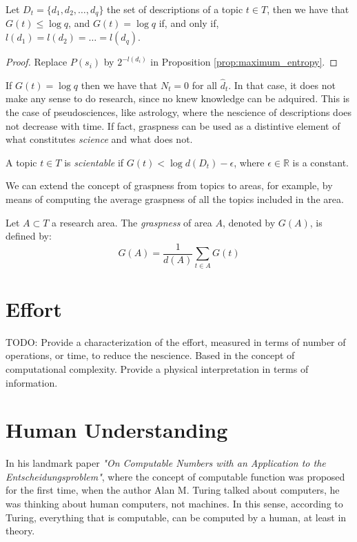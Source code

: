 \begin{proposition}
Let $D_t = \{ d_1, d_2, \ldots, d_q \}$ the set of descriptions of a topic $t \in T$, then we have that $G(t) \leq \log q$, and $G(t) = \log q$ if, and only if, $l(d_1) = l(d_2) = \ldots = l(d_q)$.
\end{proposition}
\begin{proof}
Replace $P(s_i)$ by $2^{-l(d_i)}$ in Proposition \ref{prop:maximum_entropy}.
\end{proof}

If $G(t) = \log q$ then we have that $N_t = 0$ for all $\hat{d}_t$. In that case, it does not make any sense to do research, since no knew knowledge can be adquired. This is the case of pseudosciences, like astrology, where the nescience of descriptions does not decrease with time. If fact, graspness can be used as a distintive element of what constitutes \emph{science} and what does not.

\begin{definition}
A topic $t \in T$ is \emph{scientable} if $G(t) < \log d(D_t) - \epsilon$, where $\epsilon \in \mathbb{R}$ is a constant.
\end{definition}

We can extend the concept of graspness from topics to areas, for example, by means of computing the average graspness of all the topics included in the area.

\begin{definition}
Let $A \subset T$ a research area. The \emph{graspness} of area $A$, denoted by $G(A)$, is defined by:
\[
G(A) = \frac{1}{d(A)} \sum_{t \in A} G(t)
\]
\end{definition}

%
%
\section{Effort}

{\color{red} TODO: Provide a characterization of the effort, measured in terms of number of operations, or time, to reduce the nescience. Based in the concept of computational complexity. Provide a physical interpretation in terms of information.}

%
%
\section{Human Understanding}

In his landmark paper \emph{"On Computable Numbers with an Application to the Entscheidungsproblem"}, where the concept of computable function was proposed for the first time, when the author Alan M. Turing talked about computers, he was thinking about human computers, not machines. In this sense, according to Turing, everything that is computable, can be computed by a human, at least in theory.

